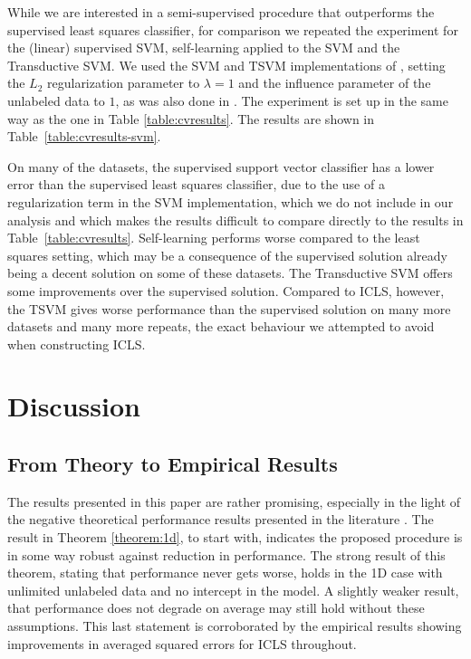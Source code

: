 \documentclass[twoside]{memoir}\usepackage[]{graphicx}\usepackage{xcolor}
\begin{document}
While we are interested in a semi-supervised procedure that outperforms the supervised least squares classifier, for comparison we repeated the experiment for the (linear) supervised SVM, self-learning applied to the SVM and the Transductive SVM. We used the SVM and TSVM implementations of \citet{Sindhwani2006},  setting the $L_2$ regularization parameter to $\lambda=1$ and the influence parameter of the unlabeled data to $1$, as was also done in \citep{Sindhwani2006}. The experiment is set up in the same way as the one in Table \ref{table:cvresults}. The results are shown in Table~\ref{table:cvresults-svm}.

On many of the datasets, the supervised support vector classifier has a lower error than the supervised least squares classifier, due to the use of a regularization term in the SVM implementation, which we do not include in our analysis and which makes the results difficult to compare directly to the results in Table~\ref{table:cvresults}. Self-learning performs worse compared to the least squares setting, which may be a consequence of the supervised solution already being a decent solution on some of these datasets. The Transductive SVM offers some improvements over the supervised solution. Compared to ICLS, however, the TSVM gives worse performance than the supervised solution on many more datasets and many more repeats, the exact behaviour we attempted to avoid when constructing ICLS.

\section{Discussion}
\subsection*{From Theory to Empirical Results}
The results presented in this paper are rather promising, especially in the light of the negative theoretical performance results presented in the literature \citep{Cozman2006}. The result in Theorem \ref{theorem:1d}, to start with, indicates the proposed procedure is in some way robust against reduction in performance. The strong result of this theorem, stating that performance never gets worse, holds in the 1D case with unlimited unlabeled data and no intercept in the model. A slightly weaker result, that performance does not degrade on average may still hold without these assumptions. This last statement is corroborated by the empirical results showing improvements in averaged squared errors for ICLS throughout.
\end{document}
